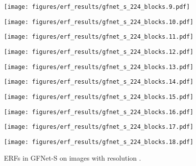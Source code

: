 \documentclass{article}
\begin{document}
\begin{figure}[tb]
\begin{minipage}[t]{0.13\hsize}
  \end{minipage}
  \begin{minipage}[t]{0.13\hsize}
    \centering
    \texttt{[image: figures/erf\_results/gfnet\_s\_224\_blocks.9.pdf]}
    \label{figure:erf_gfnet:9}
  \end{minipage}
  \begin{minipage}[t]{0.13\hsize}
    \centering
    \texttt{[image: figures/erf\_results/gfnet\_s\_224\_blocks.10.pdf]}
    \label{figure:erf_gfnet:10}
  \end{minipage}
  \begin{minipage}[t]{0.13\hsize}
    \centering
    \texttt{[image: figures/erf\_results/gfnet\_s\_224\_blocks.11.pdf]}
    \label{figure:erf_gfnet:11}
  \end{minipage}
  \begin{minipage}[t]{0.13\hsize}
    \centering
    \texttt{[image: figures/erf\_results/gfnet\_s\_224\_blocks.12.pdf]}
    \label{figure:erf_gfnet:12}
  \end{minipage}
  \begin{minipage}[t]{0.13\hsize}
    \centering
    \texttt{[image: figures/erf\_results/gfnet\_s\_224\_blocks.13.pdf]}
    \label{figure:erf_gfnet:13}
  \end{minipage}
  \begin{minipage}[t]{0.13\hsize}
    \centering
    \texttt{[image: figures/erf\_results/gfnet\_s\_224\_blocks.14.pdf]}
    \label{figure:erf_gfnet:14}
  \end{minipage}
  \begin{minipage}[t]{0.13\hsize}
    \centering
    \texttt{[image: figures/erf\_results/gfnet\_s\_224\_blocks.15.pdf]}
    \label{figure:erf_gfnet:15}
  \end{minipage}
  \begin{minipage}[t]{0.13\hsize}
    \centering
    \texttt{[image: figures/erf\_results/gfnet\_s\_224\_blocks.16.pdf]}
    \label{figure:erf_gfnet:16}
  \end{minipage}
  \begin{minipage}[t]{0.13\hsize}
    \centering
    \texttt{[image: figures/erf\_results/gfnet\_s\_224\_blocks.17.pdf]}
    \label{figure:erf_gfnet:17}
  \end{minipage}
  \begin{minipage}[t]{0.13\hsize}
    \centering
    \texttt{[image: figures/erf\_results/gfnet\_s\_224\_blocks.18.pdf]}
    \label{figure:erf_gfnet:18}
  \end{minipage}
  \caption{ERFs in GFNet-S \cite{rao2021global} on images with resolution .}
    \label{figure:erf_gfnet}
\end{figure} 
\end{document}
